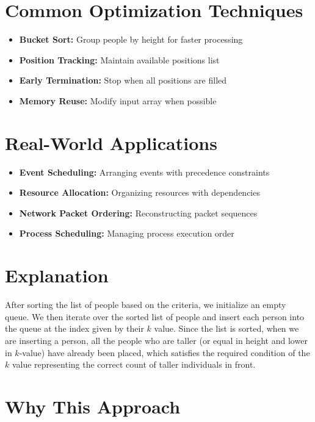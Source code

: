 \section*{Common Optimization Techniques}
\begin{itemize}
    \item \textbf{Bucket Sort:} Group people by height for faster processing
    \item \textbf{Position Tracking:} Maintain available positions list
    \item \textbf{Early Termination:} Stop when all positions are filled
    \item \textbf{Memory Reuse:} Modify input array when possible
\end{itemize}

\section*{Real-World Applications}
\begin{itemize}
    \item \textbf{Event Scheduling:} Arranging events with precedence constraints
    \item \textbf{Resource Allocation:} Organizing resources with dependencies
    \item \textbf{Network Packet Ordering:} Reconstructing packet sequences
    \item \textbf{Process Scheduling:} Managing process execution order
\end{itemize}

\section*{Explanation}

After sorting the list of people based on the criteria, we initialize an empty queue. We then iterate over the sorted list of people and insert each person into the queue at the index given by their \( k \) value. Since the list is sorted, when we are inserting a person, all the people who are taller (or equal in height and lower in \( k \)-value) have already been placed, which satisfies the required condition of the \( k \) value representing the correct count of taller individuals in front.

\section*{Why This Approach}

